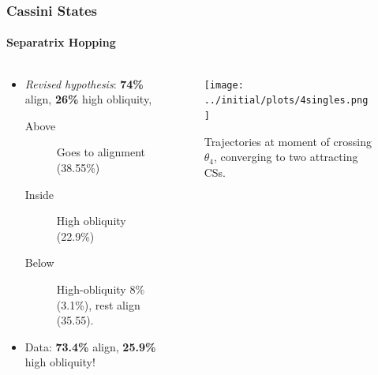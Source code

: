 \documentclass[dvipsnames]{beamer}
\begin{document}
\begin{frame}
    \frametitle{Cassini States}
    \framesubtitle{Separatrix Hopping}

    \begin{columns}
        \begin{column}{0.47\textwidth}
            \begin{itemize}
                \item \emph{Revised hypothesis}: \textbf{74\%} align,
                    \textbf{26\%} high obliquity,
                    \begin{description}
                        \item[Above] Goes to alignment (38.55\%)
                        \item[Inside] High obliquity (22.9\%)
                        \item[Below] High-obliquity 8\% (3.1\%),
                            rest align (35.55).
                    \end{description}

                \item Data: \textbf{73.4\%} align, \textbf{25.9\%}
                    high obliquity!
            \end{itemize}
        \end{column}
        \begin{column}{0.47\textwidth}
            \begin{figure}[t]
                \centering
                \texttt{[image: ../initial/plots/4singles.png]}
                \caption{Trajectories at moment of crossing $\theta_4$,
                converging to two attracting CSs.}
            \end{figure}
        \end{column}
    \end{columns}
\end{frame}
\end{document}
